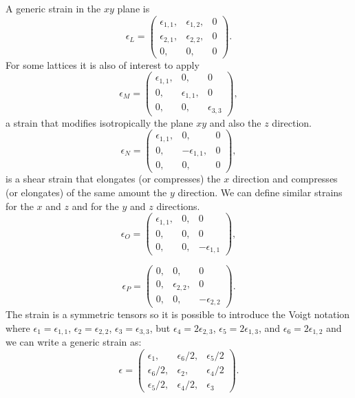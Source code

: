 \documentclass[12pt,a4paper]{article}
\begin{document}
A generic strain in the $xy$ plane is
\begin{equation}
\epsilon_L=\left( \begin{array}{ccc}
\epsilon_{1,1}, & \epsilon_{1,2}, & 0 
\\
\epsilon_{2,1}, & \epsilon_{2,2}, & 0 
\\
0, & 0, & 0
\end{array}
\right).
\end{equation}
For some lattices it is also of interest to apply
\begin{equation}
\epsilon_M=\left( \begin{array}{ccc}
\epsilon_{1,1}, & 0, & 0 
\\
0, & \epsilon_{1,1}, & 0 
\\
0, & 0, & \epsilon_{3,3}
\end{array}
\right),
\end{equation}
a strain that modifies isotropically the plane $xy$ and also the $z$ direction.
\begin{equation}
\epsilon_N=\left( \begin{array}{ccc}
\epsilon_{1,1}, & 0, & 0 
\\
0, & -\epsilon_{1,1}, & 0 
\\
0, & 0, & 0
\end{array}
\right),
\end{equation}
is a shear strain that elongates (or compresses) the $x$ direction and
compresses (or elongates) of the same amount the $y$ direction.
We can define similar strains for the $x$ and $z$ and for 
the $y$ and $z$ directions.
\begin{equation}
\epsilon_O=\left( \begin{array}{ccc}
\epsilon_{1,1}, & 0, & 0 
\\
0, & 0, & 0 
\\
0, & 0, & -\epsilon_{1,1}
\end{array}
\right),
\end{equation}

\begin{equation}
\epsilon_P=\left( \begin{array}{ccc}
0, & 0, & 0 
\\
0, & \epsilon_{2,2}, & 0 
\\
0, & 0, & -\epsilon_{2,2}
\end{array}
\right).
\end{equation}
The strain is a symmetric tensors so it is possible to introduce 
the Voigt notation where
$\epsilon_1=\epsilon_{1,1}$,
$\epsilon_2=\epsilon_{2,2}$, $\epsilon_3=\epsilon_{3,3}$, but
$\epsilon_4=2 \epsilon_{2,3}$, $\epsilon_5=2 \epsilon_{1,3}$, and
$\epsilon_6=2 \epsilon_{1,2}$ and we can write a generic strain as:
\begin{equation}
\epsilon=\left( \begin{array}{ccc}
\epsilon_1, & \epsilon_6/2, & \epsilon_5/2 
\\
\epsilon_6/2, & \epsilon_2, & \epsilon_4/2  
\\
\epsilon_5/2, & \epsilon_4/2, & \epsilon_{3}
\end{array}
\right).
\end{equation}
\end{document}
